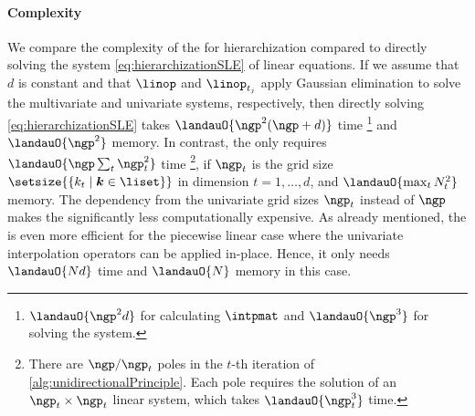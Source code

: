 \paragraph{Complexity}

We compare the complexity of the \up for hierarchization compared
to directly solving the system \eqref{eq:hierarchizationSLE} of
linear equations.
If we assume that $d$ is constant and that
$\linop$ and $\linop_{t_j}$ apply Gaussian elimination to
solve the multivariate and univariate systems, respectively,
then directly solving \eqref{eq:hierarchizationSLE} takes
$\landauO{\ngp^2 (\ngp + d)}$ time%
\footnote{%
  $\landauO{\ngp^2 d}$ for calculating $\intpmat$ and
  $\landauO{\ngp^3}$ for solving the system.
}
and
$\landauO{\ngp^2}$ memory.
In contrast, the \up only requires
$\landauO{\ngp \sum_t \ngp_t^2}$ time%
\footnote{%
  There are $\ngp/\ngp_t$ poles in the
  $t$-th iteration of \cref{alg:unidirectionalPrinciple}.
  Each pole requires the solution of an $\ngp_t \times \ngp_t$ linear system,
  which takes $\landauO{\ngp_t^3}$ time.
},
if $\ngp_t$ is the grid size
$\setsize{\{k_t \mid \*k \in \liset\}}$ in dimension $t = 1, \dotsc, d$,
and $\landauO{\max_t N_t^2}$ memory.
The dependency from the univariate grid sizes $\ngp_t$ instead of $\ngp$
makes the \up significantly less computationally expensive.
As already mentioned,
the \up is even more efficient for the piecewise linear case
where the univariate interpolation operators can be applied
in-place.
Hence, it only needs $\landauO{Nd}$ time and
$\landauO{N}$ memory in this case.
